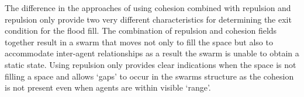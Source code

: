 \documentclass[10pt,journal,letterpaper,twoside]{IEEEtran}
\begin{document}
The difference in the approaches of using cohesion combined with repulsion and repulsion only provide two very different characteristics for determining the exit condition for the flood fill. The combination of repulsion and cohesion fields together result in a swarm that moves not only to fill the space but also to accommodate inter-agent relationships as a result the swarm is unable to obtain a static state. Using repulsion only provides clear indications when the space is not filling a space and allows `gaps' to occur in the swarms structure as the cohesion is not present even when agents are within visible `range'.



\end{document}
